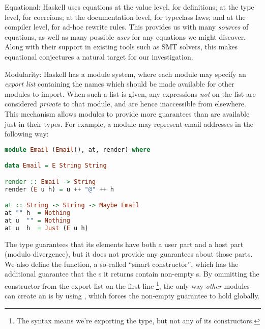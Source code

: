 \begin{description}
\item{Equational}: Haskell uses equations at the value level, for definitions; at the type level, for coercions; at the documentation level, for typeclass laws; and at the compiler level, for ad-hoc rewrite rules. This provides us with many \emph{sources} of equations, as well as many possible \emph{uses} for any equations we might discover. Along with their support in existing tools such as SMT solvers, this makes equational conjectures a natural target for our investigation.

\item{Modularity}: Haskell has a module system, where each module may specify an \emph{export list} containing the names which should be made available for other modules to import. When such a list is given, any expressions \emph{not} on the list are considered \emph{private} to that module, and are hence inaccessible from elsewhere. This mechanism allows modules to provide more guarantees than are available just in their types. For example, a module may represent email addresses in the following way:

\begin{lstlisting}[language=Haskell, xleftmargin=.2\textwidth, xrightmargin=.2\textwidth, upquote=true]
module Email (Email(), at, render) where

data Email = E String String

render :: Email -> String
render (E u h) = u ++ "@" ++ h

at :: String -> String -> Maybe Email
at "" h  = Nothing
at u  "" = Nothing
at u  h  = Just (E u h)
\end{lstlisting}

The  type guarantees that its elements have both a user part and a host part (modulo divergence), but it does not provide any guarantees about those parts. We also define the  function, a so-called ``smart constructor'', which has the additional guarantee that the s it returns contain non-empty s. By ommitting the  constructor from the export list on the first line \footnote{The syntax  means we're exporting the  type, but not any of its constructors.}, the only way \emph{other} modules can create an  is by using , which forces the non-empty guarantee to hold globally.

\end{description}

